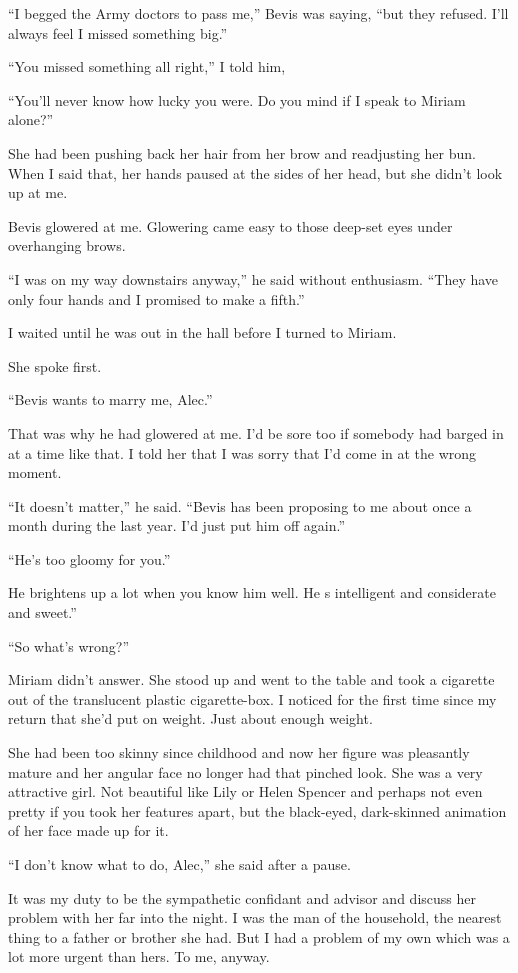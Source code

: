 \documentclass{novel}
\begin{document}
“I begged the Army doctors to pass me,” \mbox{Bevis} was saying, “but they refused. I’ll always feel I missed something big.”

“You missed something all right,” I told him,

\noindent“You’ll never know how lucky you were. Do you mind if I speak to Miriam alone?”

She had been pushing back her hair from her brow and readjusting her bun. When I said that, her hands paused at the sides of her head, but she didn’t look up at me.

Bevis glowered at me. Glowering came easy to those deep-set eyes under overhanging brows. 

“I was on my way downstairs anyway,” he said without enthusiasm. “They have only four hands and I promised to make a fifth.”

I waited until he was out in the hall before I turned to Miriam. 

She spoke first.

“Bevis wants to marry me, Alec.”

That was why he had glowered at me. I’d be sore too if somebody had barged in at a time like that. I told her that I was sorry that I’d come in at the wrong moment.

“It doesn’t matter,” he said. “Bevis has been proposing to me about once a month during the last year. I’d just put him off again.”

“He’s too gloomy for you.”

He brightens up a lot when you know him well. He s intelligent and considerate and sweet.”

“So what’s wrong?”

Miriam didn’t answer. She stood up and went to the table and took a cigarette out of the translucent plastic cigarette-box. I noticed for the first time since my return that she’d put on weight. Just about enough weight. 

She had been too skinny since childhood and now her figure was pleasantly mature and her angular face no longer had that pinched look. She was a very attractive girl. Not beautiful like Lily or Helen Spencer and perhaps not even pretty if you took her features apart, but the black-eyed, dark-skinned animation of her face made up for it.

“I don’t know what to do, Alec,” she said after a pause.

It was my duty to be the sympathetic confidant and advisor and discuss her problem with her far into the night. I was the man of the household, the nearest thing to a father or brother she had. But I had a problem of my own which was a lot more urgent than hers. To me, anyway.
\end{document}
